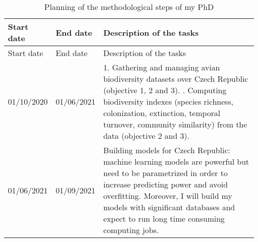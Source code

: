 \documentclass[
  12pt,
  oneside]{report}
\begin{document}
\begin{longtable}[]{@{}lll@{}}
\caption{\label{tab:sched} Planning of the methodological steps of my PhD}\tabularnewline
\toprule
\begin{minipage}[b]{0.21\columnwidth}\raggedright
Start date\strut
\end{minipage} & \begin{minipage}[b]{0.21\columnwidth}\raggedright
End date\strut
\end{minipage} & \begin{minipage}[b]{0.49\columnwidth}\raggedright
Description of the tasks\strut
\end{minipage}\tabularnewline
\midrule
\endfirsthead
\toprule
\begin{minipage}[b]{0.21\columnwidth}\raggedright
Start date\strut
\end{minipage} & \begin{minipage}[b]{0.21\columnwidth}\raggedright
End date\strut
\end{minipage} & \begin{minipage}[b]{0.49\columnwidth}\raggedright
Description of the tasks\strut
\end{minipage}\tabularnewline
\midrule
\endhead
\begin{minipage}[t]{0.21\columnwidth}\raggedright
01/10/2020\strut
\end{minipage} & \begin{minipage}[t]{0.21\columnwidth}\raggedright
01/06/2021\strut
\end{minipage} & \begin{minipage}[t]{0.49\columnwidth}\raggedright
1. Gathering and managing avian biodiversity datasets over Czech Republic (objective 1, 2 and 3). \newline 2. Computing biodiversity indexes (species richness, colonization, extinction, temporal turnover, community similarity) from the data (objective 2 and 3).\strut
\end{minipage}\tabularnewline
\begin{minipage}[t]{0.21\columnwidth}\raggedright
01/06/2021\strut
\end{minipage} & \begin{minipage}[t]{0.21\columnwidth}\raggedright
01/09/2021\strut
\end{minipage} & \begin{minipage}[t]{0.49\columnwidth}\raggedright
Building models for Czech Republic: machine learning models are powerful but need to be parametrized in order to increase predicting power and avoid overfitting. Moreover, I will build my models with significant databases and expect to run long time consuming computing jobs.\strut

\end{minipage}
\end{longtable}
\end{document}
